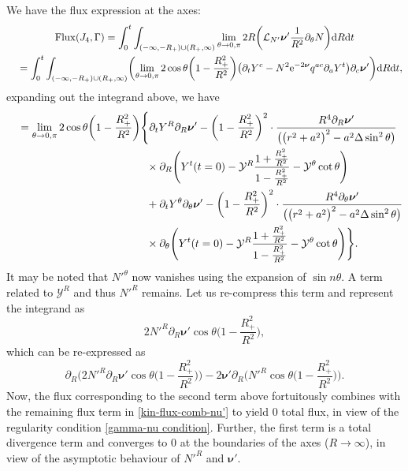 \documentclass[pdftex]{sigma}
\def\ptl{\partial}%
\def\mbo#1{\boldsymbol{#1}}%
\numberwithin{equation}{section}
\begin{document}
We have the flux expression at the axes:
\begin{gather*}
{\rm Flux} (J_4, \Gamma) = \int^t_0 \int_{ (-\infty,-R_
	+) \cup (R_+, \infty)} \lim_{\theta \to 0, \pi} 2 R \biggl(\mathcal{L}_{N'} \mbo{\nu}' \frac{1}{R^2} \ptl_\theta N \biggr) {\rm d}R {\rm d}t
\notag\\
\quad{}= \int^t_0 \int_{ (-\infty,-R_
	+) \cup (R_+, \infty)}\biggl(\lim_{\theta \to 0, \pi} 2 \cos \theta \biggl(1 - \frac{R^2_+}{R^2} \biggr) \bigl(\ptl_t Y^c - N^2 {\rm e}^{-2 \mbo{\nu}} q^{ac} \ptl_a Y^t \bigr) \ptl_c \mbo{\nu}' \biggr) {\rm d}R {\rm d}t,
\end{gather*}
expanding out the integrand above, we have
\begin{align*}
\quad&{} = \lim_{\theta \to 0, \pi} 2 \cos \theta \biggl(1 - \frac{R^2_+}{R^2} \biggr)
\Biggl\{ \ptl_t Y^R \ptl_R \mbo{\nu}' - \biggl (1- \frac{R^2_+}{R^2} \biggr)^2 \cdot \frac{R^4 \ptl_R \mbo{\nu}'}{ \bigl(\bigl(r^2+a^2\bigr)^2 -a^2 \Delta
	\sin^2 \theta \bigr)} \notag\\
&\hphantom{ = \lim_{\theta \to 0, \pi} 2 \cos \theta \biggl(1 - \frac{R^2_+}{R^2} \biggr)\Biggl\{}{}
\times \ptl_R \Biggl(Y^t (t=0) - \mathcal{Y}^R \frac{1 + \frac{R^2_+}{R^2}} {{1-\frac{R^2_+}{R^2}} } - \mathcal{Y}^ \theta \cot \theta \Biggr) \notag\\
&\hphantom{ = \lim_{\theta \to 0, \pi} 2 \cos \theta \biggl(1 - \frac{R^2_+}{R^2} \biggr)\Biggl\{}{}
+ \ptl_t Y^\theta \ptl_\theta \mbo{\nu}' - \biggl(1 - \frac{R^2_+}{R^2} \biggr)^2 \cdot \frac{R^4 \ptl_\theta \mbo{\nu}'}{ \bigl(\bigl(r^2+a^2\bigr)^2 -a^2 \Delta \sin^2 \theta\bigr)} \notag\\
&\hphantom{ = \lim_{\theta \to 0, \pi} 2 \cos \theta \biggl(1 - \frac{R^2_+}{R^2} \biggr)\Biggl\{}{}
\times \ptl_\theta \Biggl(Y^t(t=0) - \mathcal{Y}^R \frac{1+ \frac{R^2_+}{R^2}}{1-\frac{R^2_+}{R^2}} - \mathcal{Y}^\theta \cot \theta \Biggr) \Biggr\}.
\end{align*}
It may be noted that $N'^\theta$ now vanishes using the expansion of $\sin n \theta $.
A term related to $\mathcal{Y}^R$ and thus $N'^R$ remains. Let us re-compress this term and represent the integrand as
\[
2N'^R \ptl_R \mbo{\nu}' \cos \theta\biggl(1- \frac{R^2_+}{R^2}\biggr),
\]
which can be re-expressed as
\[
\ptl_R \biggl(2 N'^R \ptl_R \mbo{\nu}' \cos \theta \biggl(1- \frac{R^2_+}{R^2} \biggr) \biggr) - 2 \mbo{\nu'}\ptl_R \biggl(N'^R \cos \theta \biggl(1-\frac{R^2_+}{R^2} \biggr) \biggr).
\]
Now, the flux corresponding to the second term above fortuitously combines with the remaining flux term in \eqref{kin-flux-comb-nu'} to yield $0$ total flux, in view of the regularity condition \eqref{gamma-nu condition}. Further, the first term is a total divergence term and converges to $0$ at the boundaries of the axes ($R \to \infty$), in view of the asymptotic behaviour of $N'^R$ and $\mbo{\nu'}$.
\end{document}
